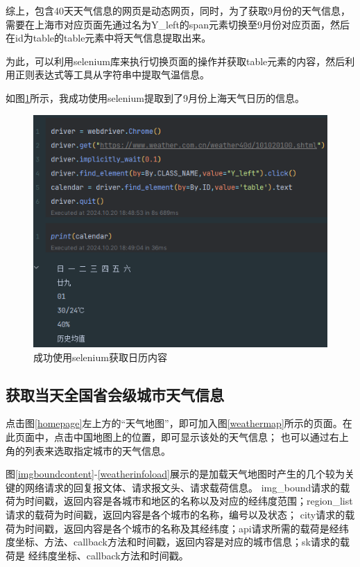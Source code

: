 综上，包含40天天气信息的网页是动态网页，同时，为了获取9月份的天气信息，需要在上海市对应页面先通过名为Y\_left的span元素切换至9月份对应页面，然后
在id为table的table元素中将天气信息提取出来。

为此，可以利用selenium库来执行切换页面的操作并获取table元素的内容，然后利用正则表达式等工具从字符串中提取气温信息。

如图\ref{success}所示，我成功使用selenium提取到了9月份上海天气日历的信息。

\begin{figure}[!htbp]
    \centering
    \includegraphics[scale=1]{figures/success.png}
    \caption{成功使用selenium获取日历内容}\label{success}
\end{figure}

\subsection{获取当天全国省会级城市天气信息}

点击图\ref{homepage}左上方的“天气地图”，即可加入图\ref{weathermap}所示的页面。在此页面中，点击中国地图上的位置，即可显示该处的天气信息；
也可以通过右上角的列表来选取指定城市的天气信息。

图\ref{imgboundcontent}-\ref{weatherinfoload}展示的是加载天气地图时产生的几个较为关键的网络请求的回复报文体、请求报文头、请求载荷信息。
img\_bound请求的载荷为时间戳，返回内容是各城市和地区的名称以及对应的经纬度范围；region\_list请求的载荷为时间戳，返回内容是各个城市的名称，编号以及状态；
city请求的载荷为时间戳，返回内容是各个城市的名称及其经纬度；api请求所需的载荷是经纬度坐标、方法、callback方法和时间戳，返回内容是对应的城市信息；sk请求的载荷是
经纬度坐标、callback方法和时间戳。

